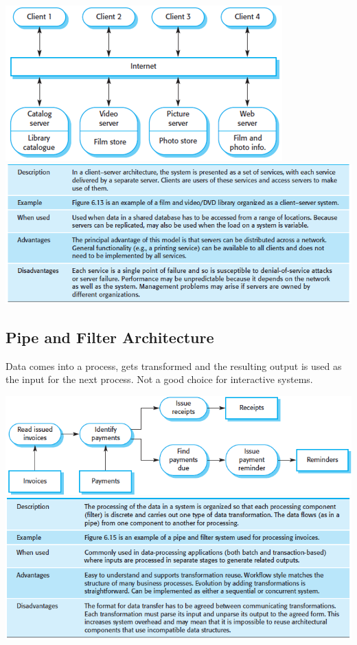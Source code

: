 \documentclass{article}
\begin{document}
    \begin{center}
        \includegraphics[scale=0.7]{client-server_architecture.png}
        \includegraphics[scale=0.7]{client-server_architecture-desc.png}
    \end{center}

    \subsection*{Pipe and Filter Architecture}

    Data comes into a process, gets transformed and the resulting output is used as the 
    input for the next process. Not a good choice for interactive systems.

    \begin{center}
        \includegraphics[scale=0.7]{pipe_and_filter_architecture.png}
        \includegraphics[scale=0.7]{pipe_and_filter_architecture-desc.png}
    \end{center}
\end{document}
